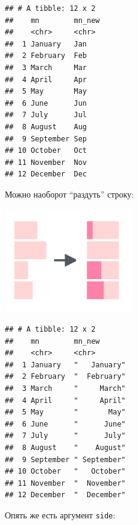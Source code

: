 \documentclass[
]{book}
\newenvironment{Shaded}{\begin{snugshade}}{\end{snugshade}}
\newcommand{\DataTypeTok}[1]{\textcolor[rgb]{0.13,0.29,0.53}{#1}}
\newcommand{\DecValTok}[1]{\textcolor[rgb]{0.00,0.00,0.81}{#1}}
\newcommand{\KeywordTok}[1]{\textcolor[rgb]{0.13,0.29,0.53}{\textbf{#1}}}
\newcommand{\NormalTok}[1]{#1}
\newcommand{\OperatorTok}[1]{\textcolor[rgb]{0.81,0.36,0.00}{\textbf{#1}}}
\newcommand{\StringTok}[1]{\textcolor[rgb]{0.31,0.60,0.02}{#1}}
\begin{document}
\begin{verbatim}
## # A tibble: 12 x 2
##    mn        mn_new
##    <chr>     <chr> 
##  1 January   Jan   
##  2 February  Feb   
##  3 March     Mar   
##  4 April     Apr   
##  5 May       May   
##  6 June      Jun   
##  7 July      Jul   
##  8 August    Aug   
##  9 September Sep   
## 10 October   Oct   
## 11 November  Nov   
## 12 December  Dec
\end{verbatim}

Можно наоборот ``раздуть'' строку:

\includegraphics{images/5.03_str_pad.png}

\begin{Shaded}
\end{Shaded}

\begin{verbatim}
## # A tibble: 12 x 2
##    mn        mn_new      
##    <chr>     <chr>       
##  1 January   "   January"
##  2 February  "  February"
##  3 March     "     March"
##  4 April     "     April"
##  5 May       "       May"
##  6 June      "      June"
##  7 July      "      July"
##  8 August    "    August"
##  9 September " September"
## 10 October   "   October"
## 11 November  "  November"
## 12 December  "  December"
\end{verbatim}

Опять же есть аргумент \texttt{side}:

\begin{Shaded}
\end{Shaded}
\end{document}
